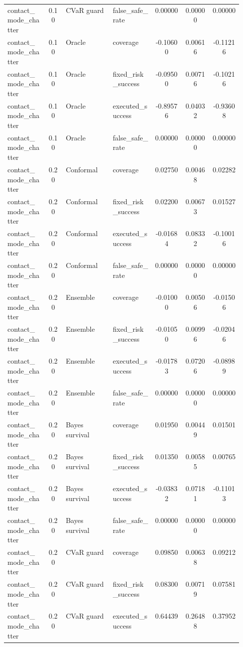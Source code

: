 \documentclass{article}
\begin{document}
\begin{center}
\begin{longtable}{p{0.17\linewidth}cp{0.20\linewidth}p{0.18\linewidth}ccc}
contact\_mode\_chatter & 0.10 & CVaR guard & false\_safe\_rate & 0.00000 & 0.00000 & 0.00000\\
contact\_mode\_chatter & 0.10 & Oracle & coverage & -0.10600 & 0.00616 & -0.11216\\
contact\_mode\_chatter & 0.10 & Oracle & fixed\_risk\_success & -0.09500 & 0.00716 & -0.10216\\
contact\_mode\_chatter & 0.10 & Oracle & executed\_success & -0.89576 & 0.04032 & -0.93608\\
contact\_mode\_chatter & 0.10 & Oracle & false\_safe\_rate & 0.00000 & 0.00000 & 0.00000\\
contact\_mode\_chatter & 0.20 & Conformal & coverage & 0.02750 & 0.00468 & 0.02282\\
contact\_mode\_chatter & 0.20 & Conformal & fixed\_risk\_success & 0.02200 & 0.00673 & 0.01527\\
contact\_mode\_chatter & 0.20 & Conformal & executed\_success & -0.01684 & 0.08332 & -0.10016\\
contact\_mode\_chatter & 0.20 & Conformal & false\_safe\_rate & 0.00000 & 0.00000 & 0.00000\\
contact\_mode\_chatter & 0.20 & Ensemble & coverage & -0.01000 & 0.00506 & -0.01506\\
contact\_mode\_chatter & 0.20 & Ensemble & fixed\_risk\_success & -0.01050 & 0.00996 & -0.02046\\
contact\_mode\_chatter & 0.20 & Ensemble & executed\_success & -0.01783 & 0.07206 & -0.08989\\
contact\_mode\_chatter & 0.20 & Ensemble & false\_safe\_rate & 0.00000 & 0.00000 & 0.00000\\
contact\_mode\_chatter & 0.20 & Bayes survival & coverage & 0.01950 & 0.00449 & 0.01501\\
contact\_mode\_chatter & 0.20 & Bayes survival & fixed\_risk\_success & 0.01350 & 0.00585 & 0.00765\\
contact\_mode\_chatter & 0.20 & Bayes survival & executed\_success & -0.03832 & 0.07181 & -0.11013\\
contact\_mode\_chatter & 0.20 & Bayes survival & false\_safe\_rate & 0.00000 & 0.00000 & 0.00000\\
contact\_mode\_chatter & 0.20 & CVaR guard & coverage & 0.09850 & 0.00638 & 0.09212\\
contact\_mode\_chatter & 0.20 & CVaR guard & fixed\_risk\_success & 0.08300 & 0.00719 & 0.07581\\
contact\_mode\_chatter & 0.20 & CVaR guard & executed\_success & 0.64439 & 0.26488 & 0.37952\\

\end{longtable}
\end{center}
\end{document}
